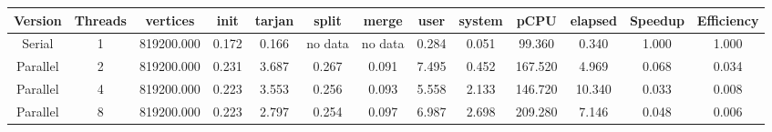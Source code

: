 \begin{tabular}{|c|c|c|c|c|c|c|c|c|c|c|c|c|}
\toprule
 Version &  Threads &   vertices &  init &  tarjan &   split &   merge &  user &  system &    pCPU &  elapsed &  Speedup &  Efficiency \\
\midrule
  Serial &        1 & 819200.000 & 0.172 &   0.166 & no data & no data & 0.284 &   0.051 &  99.360 &    0.340 &    1.000 &       1.000 \\
Parallel &        2 & 819200.000 & 0.231 &   3.687 &   0.267 &   0.091 & 7.495 &   0.452 & 167.520 &    4.969 &    0.068 &       0.034 \\
Parallel &        4 & 819200.000 & 0.223 &   3.553 &   0.256 &   0.093 & 5.558 &   2.133 & 146.720 &   10.340 &    0.033 &       0.008 \\
Parallel &        8 & 819200.000 & 0.223 &   2.797 &   0.254 &   0.097 & 6.987 &   2.698 & 209.280 &    7.146 &    0.048 &       0.006 \\
\bottomrule
\end{tabular}

